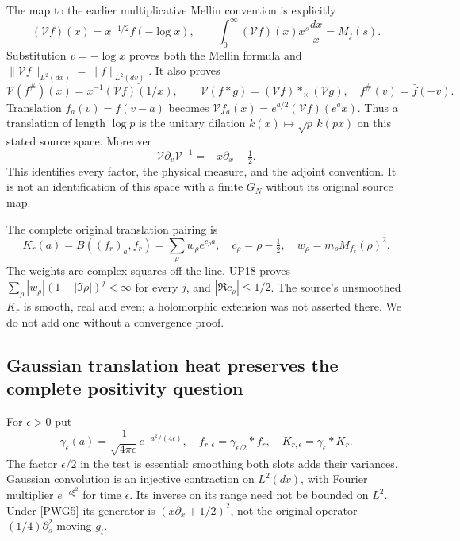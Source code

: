 \documentclass[11pt,a4paper]{article}
\theoremstyle{definition}\newtheorem{definition}[theorem]{Definition}
\begin{document}
The map to the earlier multiplicative Mellin convention is explicitly
\begin{equation}
 (\mathcal Vf)(x)=x^{-1/2}f(-\log x),\qquad
 \int_0^\infty(\mathcal Vf)(x)x^s\frac{dx}{x}=M_f(s).
                                                               \tag{PWG4}\label{PWG4}
\end{equation}
Substitution $v=-\log x$ proves both the Mellin formula and
$\|\mathcal Vf\|_{L^2(dx)}=\|f\|_{L^2(dv)}$.
It also proves
\[
 \mathcal V(f^\#)(x)=x^{-1}\overline{(\mathcal Vf)(1/x)},\qquad
 \mathcal V(f*g)=(\mathcal Vf)*_\times(\mathcal Vg),
 \quad f^\#(v)=\bar f(-v).
\]
Translation $f_a(v)=f(v-a)$ becomes
$\mathcal V f_a(x)=e^{a/2}(\mathcal Vf)(e^ax)$. Thus a translation of length $\log p$ is the unitary dilation $k(x)\mapsto\sqrt p\,k(px)$ on this stated source space. Moreover
\begin{equation}
 \mathcal V\partial_v\mathcal V^{-1}=-x\partial_x-\tfrac12.
                                                               \tag{PWG5}\label{PWG5}
\end{equation}
This identifies every factor, the physical measure, and the adjoint convention. It is not an identification of this space with a finite $G_N$ without its original source map.

The complete original translation pairing is
\begin{equation}
 K_r(a)=B((f_r)_a,f_r)
       =\sum_\rho w_\rho e^{c_\rho a},\quad
 c_\rho=\rho-\tfrac12,\quad
 w_\rho=m_\rho M_{f_r}(\rho)^2.                              \tag{PWG6}\label{PWG6}
\end{equation}
The weights are complex squares off the line. UP18 proves
$\sum_\rho|w_\rho|(1+|\Im\rho|)^j<\infty$ for every $j$, and
$|\Re c_\rho|\le1/2$. The source's unsmoothed $K_r$ is smooth, real and even; a holomorphic extension was not asserted there. We do not add one without a convergence proof.

\subsection{Gaussian translation heat preserves the complete positivity question}
For $\epsilon>0$ put
\begin{equation}
 \gamma_\epsilon(a)=\frac1{\sqrt{4\pi\epsilon}}e^{-a^2/(4\epsilon)},
 \quad f_{r,\epsilon}=\gamma_{\epsilon/2}*f_r,
 \quad K_{r,\epsilon}=\gamma_\epsilon*K_r.                  \tag{PWG7}\label{PWG7}
\end{equation}
The factor $\epsilon/2$ in the test is essential: smoothing both slots adds their variances. Gaussian convolution is an injective contraction on $L^2(dv)$, with Fourier multiplier $e^{-\epsilon\xi^2}$ for time $\epsilon$. Its inverse on its range need not be bounded on $L^2$. Under \eqref{PWG5} its generator is $(x\partial_x+1/2)^2$, not the original operator $(1/4)\partial_s^2$ moving $g_t$.
\end{document}

